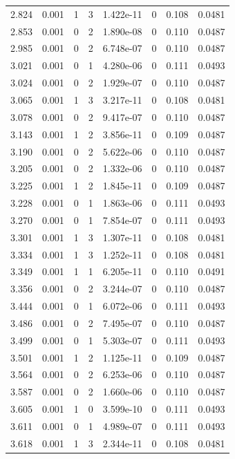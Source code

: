 \documentclass[preview]{standalone}
\begin{document}
{{{\begin{tabular}{L{1.2cm}C{1.2cm} C{0.3cm}C{0.5cm} C{1.4cm}C{1.4cm} C{1.4cm}C{1.4cm}}
  2.824  &  0.001  & 1     &  3 &  1.422e-11  & 0  & 0.108 &  0.0481   \\ 
  2.853  &  0.001  & 0     &  2 &  1.890e-08  & 0  & 0.110 &  0.0487   \\ 
  2.985  &  0.001  & 0     &  2 &  6.748e-07  & 0  & 0.110 &  0.0487   \\ 
  3.021  &  0.001  & 0     &  1 &  4.280e-06  & 0  & 0.111 &  0.0493   \\ 
  3.024  &  0.001  & 0     &  2 &  1.929e-07  & 0  & 0.110 &  0.0487   \\ 
  3.065  &  0.001  & 1     &  3 &  3.217e-11  & 0  & 0.108 &  0.0481   \\ 
  3.078  &  0.001  & 0     &  2 &  9.417e-07  & 0  & 0.110 &  0.0487   \\ 
  3.143  &  0.001  & 1     &  2 &  3.856e-11  & 0  & 0.109 &  0.0487   \\ 
  3.190  &  0.001  & 0     &  2 &  5.622e-06  & 0  & 0.110 &  0.0487   \\ 
  3.205  &  0.001  & 0     &  2 &  1.332e-06  & 0  & 0.110 &  0.0487   \\ 
  3.225  &  0.001  & 1     &  2 &  1.845e-11  & 0  & 0.109 &  0.0487   \\ 
  3.228  &  0.001  & 0     &  1 &  1.863e-06  & 0  & 0.111 &  0.0493   \\ 
  3.270  &  0.001  & 0     &  1 &  7.854e-07  & 0  & 0.111 &  0.0493   \\ 
  3.301  &  0.001  & 1     &  3 &  1.307e-11  & 0  & 0.108 &  0.0481   \\ 
  3.334  &  0.001  & 1     &  3 &  1.252e-11  & 0  & 0.108 &  0.0481   \\ 
  3.349  &  0.001  & 1     &  1 &  6.205e-11  & 0  & 0.110 &  0.0491   \\ 
  3.356  &  0.001  & 0     &  2 &  3.244e-07  & 0  & 0.110 &  0.0487   \\ 
  3.444  &  0.001  & 0     &  1 &  6.072e-06  & 0  & 0.111 &  0.0493   \\ 
  3.486  &  0.001  & 0     &  2 &  7.495e-07  & 0  & 0.110 &  0.0487   \\ 
  3.499  &  0.001  & 0     &  1 &  5.303e-07  & 0  & 0.111 &  0.0493   \\ 
  3.501  &  0.001  & 1     &  2 &  1.125e-11  & 0  & 0.109 &  0.0487   \\ 
  3.564  &  0.001  & 0     &  2 &  6.253e-06  & 0  & 0.110 &  0.0487   \\ 
  3.587  &  0.001  & 0     &  2 &  1.660e-06  & 0  & 0.110 &  0.0487   \\ 
  3.605  &  0.001  & 1     &  0 &  3.599e-10  & 0  & 0.111 &  0.0493   \\ 
  3.611  &  0.001  & 0     &  1 &  4.989e-07  & 0  & 0.111 &  0.0493   \\ 
  3.618  &  0.001  & 1     &  3 &  2.344e-11  & 0  & 0.108 &  0.0481   \\ 
\hline 
\end{tabular} 

}}}
\end{document}
